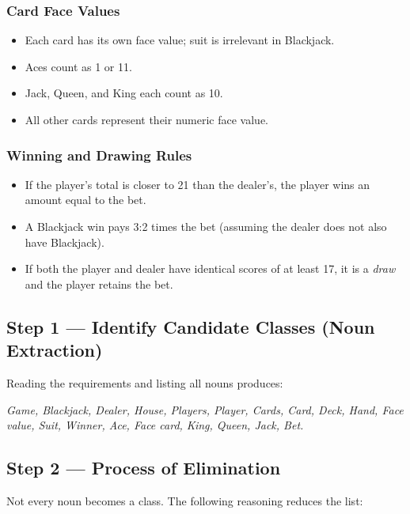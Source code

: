 \documentclass[11pt, a4paper, notitlepage]{report}
\theoremstyle{definition}
\theoremstyle{remark}
\theoremstyle{definition}
\begin{document}
\subsubsection{Card Face Values}
\begin{itemize}
  \item Each card has its own face value; suit is irrelevant in Blackjack.
  \item Aces count as 1 or 11.
  \item Jack, Queen, and King each count as 10.
  \item All other cards represent their numeric face value.
\end{itemize}

\subsubsection{Winning and Drawing Rules}
\begin{itemize}
  \item If the player's total is closer to 21 than the dealer's, the player wins an
        amount equal to the bet.
  \item A Blackjack win pays 3:2 times the bet (assuming the dealer does not also have
        Blackjack).
  \item If both the player and dealer have identical scores of at least 17, it is a
        \emph{draw} and the player retains the bet.
\end{itemize}

\subsection{Step 1 --- Identify Candidate Classes (Noun Extraction)}
\label{subsec:ch8-nouns}

Reading the requirements and listing all nouns produces:

\noindent
\emph{Game, Blackjack, Dealer, House, Players, Player, Cards, Card, Deck, Hand,
Face value, Suit, Winner, Ace, Face card, King, Queen, Jack, Bet.}

\subsection{Step 2 --- Process of Elimination}
\label{subsec:ch8-elimination}

Not every noun becomes a class. The following reasoning reduces the list:
\end{document}
